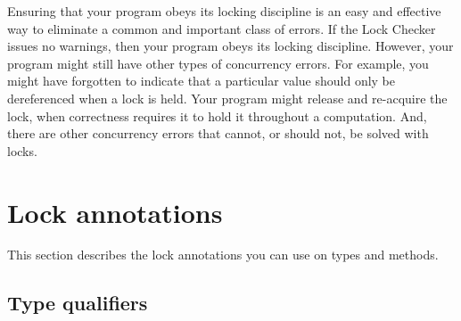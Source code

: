 Ensuring that your program obeys its locking discipline is an easy and
effective way to eliminate a common and important class of errors.
If the Lock Checker issues no warnings, then your program obeys its locking discipline.
However, your program might still have other types of concurrency errors.
For example, you might have forgotten to indicate that a particular value
should only be dereferenced when a lock is held.  Your program might release and
re-acquire the lock, when correctness requires it to hold it throughout a
computation.  And, there are other concurrency errors that cannot, or
should not, be solved with locks.


\section{Lock annotations\label{lock-annotations}}

This section describes the lock annotations you can use on types and methods.


\subsection{Type qualifiers\label{lock-type-qualifiers}}

